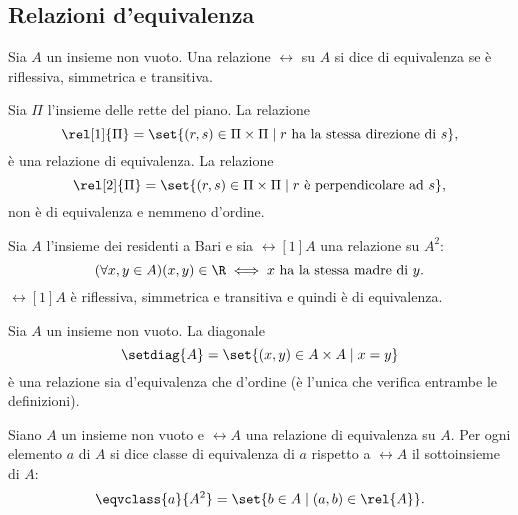 \subsection{Relazioni d'equivalenza}\label{sec:Relazioni_d'equivalenza}

\begin{definition}\label{def:relazione_d'equivalenza}
    Sia \(A\) un insieme non vuoto. Una relazione \(\rel{}\) su \(A\) si dice di equivalenza se è riflessiva, simmetrica e transitiva.
\end{definition}

\begin{example}
    Sia \(\Pi\) l'insieme delle rette del piano. La relazione
    \[
        \rel[1]{\Pi} = \set{(r, s) \in \Pi \times \Pi \mid r \text{ ha la stessa direzione di } s},
    \]
    è una relazione di equivalenza. La relazione
    \[
        \rel[2]{\Pi} = \set{(r, s) \in \Pi \times \Pi \mid r \text{ è perpendicolare ad } s},
    \]
    non è di equivalenza e nemmeno d'ordine.
\end{example}

\begin{example}
    Sia \(A\) l'insieme dei residenti a Bari e sia \(\rel[1]{A}\) una relazione su \(A^2\):
    \[
        (\forall x,y \in A) (x, y) \in \R \iff x \text{ ha la stessa madre di } y.
    \]
    \(\rel[1]{A}\) è riflessiva, simmetrica e transitiva e quindi è di equivalenza.
\end{example}

\begin{example}
    Sia \(A\) un insieme non vuoto. La diagonale
    \[
        \setdiag{A} = \set{(x, y) \in A \times A \mid x = y}
    \]
    è una relazione sia d'equivalenza che d'ordine (è l'unica che verifica entrambe le definizioni).
\end{example}


\begin{definition}\label{def:classe_d'equivalenza}
    Siano \(A\) un insieme non vuoto e \(\rel{A}\) una relazione di equivalenza su \(A\). Per ogni elemento \(a\) di \(A\) si dice classe di equivalenza di \(a\) rispetto a \(\rel{A}\) il sottoinsieme di \(A\):
    \[
        \eqvclass{a}{A^2} = \set{b \in A \mid (a, b) \in \rel{A}}.
    \]
\end{definition}

